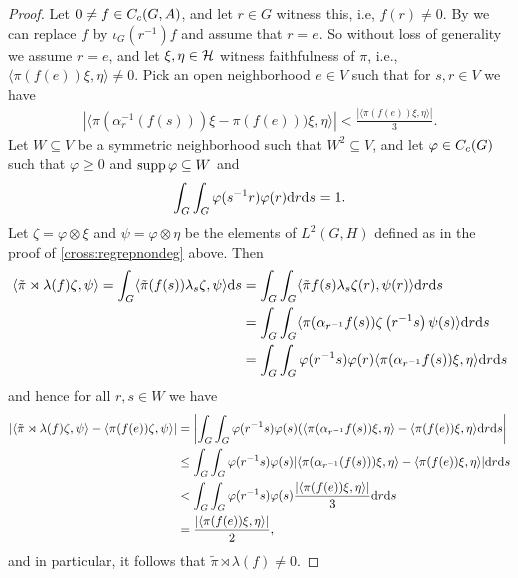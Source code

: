 \begin{proof}
Let $0 \neq f \in C_c(G,A)$, and let $r \in G$ witness this, i.e, $f(r) \neq 0$. By  we can replace $f$ by $\iota_G(r^{-1})f$ and assume that $r=e$. So without loss of generality we assume $r = e$, and let $\xi, \eta \in \mathcal{H}$ witness faithfulness of $\pi$, i.e., $\langle \pi ( f(e)) \xi, \eta \rangle \neq 0$. Pick an open neighborhood $e \in V$ such that for $s,r \in V$ we have 
\begin{align*}
	| \langle \pi(\alpha_r^{-1}(f(s))) \xi  - \pi(f(e)))\xi , \eta \rangle|  < \frac{| \langle \pi (f(e)) \xi , \eta\rangle|}{3}.
\end{align*}
Let $W \subseteq V$ be a symmetric neighborhood such that $W^2 \subseteq V$, and let $\varphi \in C_c(G)$ such that $\varphi \geq 0$ and $\operatorname{supp} \varphi \subseteq W$ and
\begin{align*}
\int_G \int_G \varphi(s^{-1}r) \varphi(r) \mathrm{d} r \mathrm{d} s = 1.
\end{align*}
Let $\zeta = \varphi \otimes \xi$ and $\psi = \varphi \otimes \eta$ be the elements of $L^2(G,H)$ defined as in the proof of \cref{cross:regrepnondeg} above. Then
\begin{align*}
\langle \tilde{ \pi } \rtimes \lambda (f) \zeta, \psi \rangle  =  \int_G \langle \tilde{\pi}(f(s)) \lambda_s \zeta , \psi\rangle \mathrm{d} s &= \int_G \int_G \langle \tilde{\pi} f(s) \lambda_s \zeta(r) , \psi(r) \rangle \mathrm{d} r \mathrm{d} s\\
&= \int_G \int_G \langle \pi(\alpha_{r^{-1}}f(s)) \zeta\left( r^{-1}s \right) \psi(s) \rangle \mathrm{d} r \mathrm{d} s\\
&= \int_G \int_G \varphi(r^{-1}s) \varphi(r) \langle \pi(\alpha_{r^{-1}}f(s)) \xi , \eta \rangle \mathrm{d} r \mathrm{d} s
\end{align*}
and hence for all $r,s \in W$ we have
\begin{align*}
\left | \langle\tilde{\pi} \rtimes \lambda (f) \zeta , \psi \rangle - \langle \pi(f(e)) \zeta , \psi \rangle\right | &=  \left |  \int_G \int_G\varphi(r^{-1}s) \varphi (s) (\langle \pi(\alpha_{r^{-1}} f(s)) \xi , \eta \rangle - \langle \pi(f(e)) \xi , \eta \rangle  \mathrm{d} r \mathrm{d} s \right | \\
&\leq \int_G \int_G \varphi(r^{-1}s ) \varphi (s) | \langle \pi(\alpha_{r^{-1}}(f(s))) \xi , \eta\rangle - \langle \pi(f(e)) \xi , \eta \rangle | \mathrm{d} r \mathrm{d} s \\
&< \int_G \int_G \varphi(r^{-1}s) \varphi(s) \frac{| \langle \pi(f(e)) \xi, \eta \rangle|}{3} \mathrm{d} r \mathrm{d} s \\
&= \frac{| \langle \pi(f(e)) \xi , \eta \rangle|} {2},
\end{align*}
and in particular, it follows that $\tilde{\pi} \rtimes \lambda (f) \neq 0$.
\end{proof}

